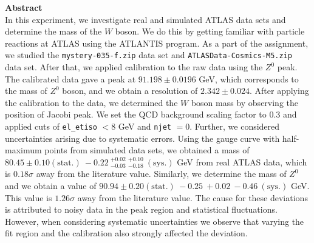 \documentclass[a4paper]{report}
\numberwithin{equation}{section}
\begin{document}
\begin{titlepage}
	\vspace*{5em}

	\begin{minipage}{0.8\textwidth}
		\begin{centering}
			\textbf{Abstract}\\[0.2cm]
            In this experiment, we investigate real and simulated ATLAS data sets and determine the mass of the $W$ boson. We do this by getting familiar with particle reactions at ATLAS using the ATLANTIS program. As a part of the assignment, we studied the \texttt{mystery-035-f.zip} data set and \texttt{ATLASData-Cosmics-M5.zip} data set. After that, we applied calibration to the raw data using the $Z^0$ peak. The calibrated data gave a peak at $91.198 \pm 0.0196$ GeV, which corresponds to the mass of $Z^0$ boson, and we obtain a resolution of $2.342 \pm 0.024$. After applying the calibration to the data, we determined the $W$ boson mass by observing the position of Jacobi peak. We set the QCD background scaling factor to 0.3 and applied cuts of \texttt{el\_etiso} $< 8$ GeV and \texttt{njet} $=0$. Further, we considered uncertainties arising due to systematic errors. Using the gauge curve with half-maximum points from simulated data sets, we obtained a mass of $80.45 \pm 0.10 (\mathrm{stat.}) \: -0.22 \: ^{+0.02}_{-0.03} \: ^{+0.10}_{-0.18} \: (\mathrm{sys.})$ GeV from real ATLAS data, which is $0.18\sigma$ away from the literature value. Similarly, we determine the mass of $Z^0$ and we obtain a value of $90.94 \pm 0.20 (\mathrm{stat.}) \: -0.25 \: + 0.02 \: -0.46 \: (\mathrm{sys.})$ GeV. This value is $1.26\sigma$ away from the literature value. The cause for these deviations is attributed to noisy data in the peak region and statistical fluctuations. However, when considering systematic uncertainties we observe that varying the fit region and the calibration also strongly affected the deviation. 
		\end{centering}
	\end{minipage}
	
	
	
	

\end{titlepage}
\end{document}

